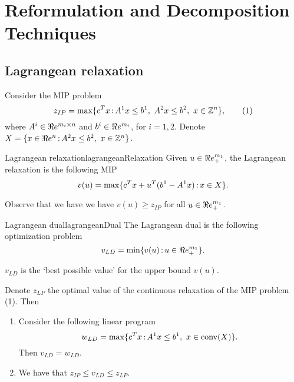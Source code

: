 

%
%
\chapter{Reformulation and Decomposition Techniques}

\section{Lagrangean relaxation}

Consider the MIP problem
$$z_{IP}=\max \{ c^Tx{\,:\,} A^1x\leq b^1,\ A^2x\leq b^2,\ x\in{\mathbb{Z}}^n\},\qquad (1)$$
where $A^i\in\Re e^{m_i\times n}$ and $b^i\in\Re e^{m_i}$, for $i=1,2$. Denote $X=\{x\in\R^n\tq A^2x\leq b^2,\ x\in\Z^n\}$.

\begin{definition}{Lagrangean relaxation}{lagrangeanRelaxation} Given $u\in\Re e^{m_1}_+$, the Lagrangean relaxation is the following MIP
$$v(u)=\max \{c^Tx+ u^T(b^1-A^1x){\,:\,} x\in X\}.$$
\end{definition}

\begin{remark}{}{}
Observe that we have  we have $v(u)\geq z_{IP}$ for all $u\in\Re e^{m_1}_+$.
\end{remark}

\begin{definition}{Lagrangean dual}{lagrangeanDual} The Lagrangean dual is the following optimization  problem
$$v_{LD}=\min\{v(u){\,:\,} u\in\Re e^{m_1}_+\}.$$
\end{definition}

\begin{remark}{}{}
$v_{LD}$ is the `best possible value' for the upper bound $v(u)$.
\end{remark}

\begin{theorem}{}{} Denote $z_{LP}$ the optimal value of the continuous relaxation of the MIP problem (1). Then
\begin{enumerate}
\item  Consider the following linear program
	$$w_{LD}=\max\{c^Tx\tq A^1x\leq b^1,\ x\in\conv(X)\}.$$
	Then $v_{LD}=w_{LD}$. 
	\item We have that $z_{IP}\leq v_{LD} \leq z_{LP}$.
\end{enumerate}
\end{theorem}

